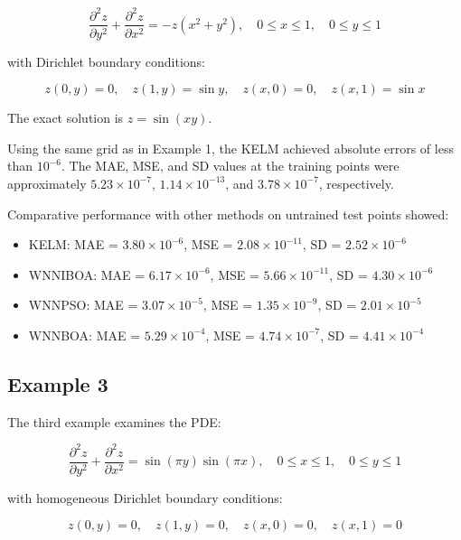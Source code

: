 \documentclass[11pt,a4paper]{article}
\begin{document}
\begin{equation}
\frac{\partial^2 z}{\partial y^2} + \frac{\partial^2 z}{\partial x^2} = -z(x^2+y^2), \quad 0 \leq x \leq 1, \quad 0 \leq y \leq 1
\end{equation}

with Dirichlet boundary conditions:

\begin{equation}
z(0,y) = 0, \quad z(1,y) = \sin y, \quad z(x,0) = 0, \quad z(x,1) = \sin x
\end{equation}

The exact solution is $z = \sin(xy)$.

Using the same grid as in Example 1, the KELM achieved absolute errors of less than $10^{-6}$. The MAE, MSE, and SD values at the training points were approximately $5.23 \times 10^{-7}$, $1.14 \times 10^{-13}$, and $3.78 \times 10^{-7}$, respectively.

Comparative performance with other methods on untrained test points showed:

\begin{itemize}
    \item KELM: MAE = $3.80 \times 10^{-6}$, MSE = $2.08 \times 10^{-11}$, SD = $2.52 \times 10^{-6}$
    \item WNNIBOA: MAE = $6.17 \times 10^{-6}$, MSE = $5.66 \times 10^{-11}$, SD = $4.30 \times 10^{-6}$
    \item WNNPSO: MAE = $3.07 \times 10^{-5}$, MSE = $1.35 \times 10^{-9}$, SD = $2.01 \times 10^{-5}$
    \item WNNBOA: MAE = $5.29 \times 10^{-4}$, MSE = $4.74 \times 10^{-7}$, SD = $4.41 \times 10^{-4}$
\end{itemize}

\subsection{Example 3}
The third example examines the PDE:

\begin{equation}
\frac{\partial^2 z}{\partial y^2} + \frac{\partial^2 z}{\partial x^2} = \sin(\pi y) \sin(\pi x), \quad 0 \leq x \leq 1, \quad 0 \leq y \leq 1
\end{equation}

with homogeneous Dirichlet boundary conditions:

\begin{equation}
z(0,y) = 0, \quad z(1,y) = 0, \quad z(x,0) = 0, \quad z(x,1) = 0
\end{equation}
\end{document}
